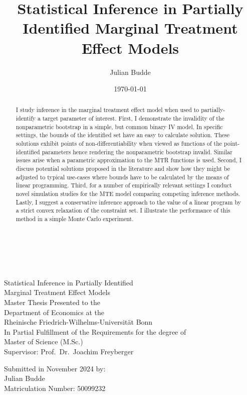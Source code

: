 \documentclass[12pt,a4paper,english]{article} %
\title{Statistical Inference in Partially Identified Marginal Treatment Effect Models}
\author{Julian Budde}
\date{\today}
\numberwithin{equation}{section}
\theoremstyle{definition}
\theoremstyle{remark}
\theoremstyle{plain}
\begin{document}
\begin{titlepage}
	\linespread{1.5}

\begin{center}
$~~$\\
$~~$\\
{\Large
Statistical Inference in Partially Identified \\[-0.5em]
Marginal Treatment Effect Models \\[3.5cm]
\large Master Thesis Presented to the \\
 Department of Economics at the \\
 Rheinische Friedrich-Wilhelms-Universität Bonn \\[1cm]
 In Partial Fulfillment of the Requirements for the degree of \\
 Master of Science (M.Sc.) \\[6.5cm]
 Supervisor: Prof.\ Dr.\ Joachim Freyberger \\[2cm]
\begin{singlespacing}
 Submitted in November 2024 by: \\
 Julian Budde \\
 Matriculation Number: 50099232
 \end{singlespacing}}
\end{center}

\restoregeometry
\end{titlepage}

\maketitle

\begin{abstract}
	I study inference in the marginal treatment effect model when used to partially-identify a target parameter of interest.
	First, I demonstrate the invalidity of the nonparametric bootstrap in a simple, but common binary IV model.
	In specific settings, the bounds of the identified set have an easy to calculate solution.
	These solutions exhibit points of non-differentiability when viewed as functions of the point-identified parameters hence rendering the nonparametric bootstrap invalid.
	Similar issues arise when a parametric approximation to the MTR functions is used.
  Second, I discuss potential solutions proposed in the literature and show how they might be adjusted to typical use-cases where bounds have to be calculated by the means of linear programming.
	Third, for a number of empirically relevant settings I conduct novel simulation studies for the MTE model comparing competing inference methods.
  Lastly, I suggest a conservative inference approach to the value of a linear program by a strict convex relaxation of the constraint set.
  I illustrate the performance of this method in a simple Monte Carlo experiment.
\end{abstract}
\end{document}
